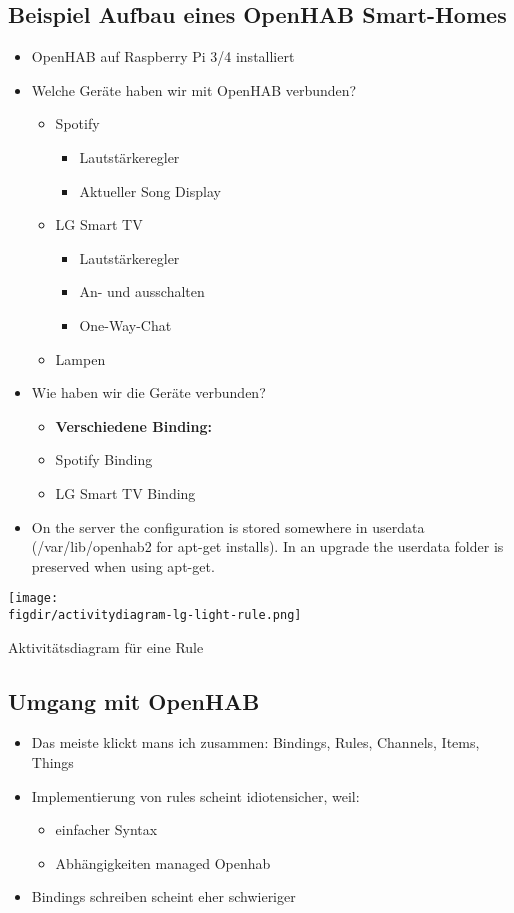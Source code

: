 \subsection{Beispiel Aufbau eines OpenHAB Smart-Homes}
\begin{itemize}
	\item OpenHAB auf Raspberry Pi 3/4 installiert
	\item Welche Geräte haben wir mit OpenHAB verbunden?
	\begin{itemize}
		\item Spotify
		\begin{itemize}
			\item Lautstärkeregler
			\item Aktueller Song Display
		\end{itemize}
		\item LG Smart TV
		\begin{itemize}
			\item Lautstärkeregler
			\item An- und ausschalten
			\item One-Way-Chat
		\end{itemize}
		\item Lampen
	\end{itemize}
	\item Wie haben wir die Geräte verbunden?
	\begin{itemize}
		\item \textbf{Verschiedene Binding:}
		\item Spotify Binding
		\item LG Smart TV Binding
	\end{itemize}
	\item On the server the configuration is stored somewhere in userdata (/var/lib/openhab2 for apt-get installs).
	In an upgrade the userdata folder is preserved when using apt-get.
\end{itemize}

\begin{minipage}{\textwidth}
	\centering
	\captionsetup{type=figure}
	\texttt{[image: \\figdir/activitydiagram-lg-light-rule.png]}
	\caption{Aktivitätsdiagram für eine Rule \label{fig:activity-diagram}}
\end{minipage}

\subsection{Umgang mit OpenHAB}
\begin{itemize}
	\item Das meiste klickt mans ich zusammen: Bindings, Rules, Channels, Items, Things
	\item Implementierung von rules scheint idiotensicher, weil:
	\begin{itemize}
		\item einfacher Syntax
		\item Abhängigkeiten managed Openhab
	\end{itemize}
	\item Bindings schreiben scheint eher schwieriger
\end{itemize}

